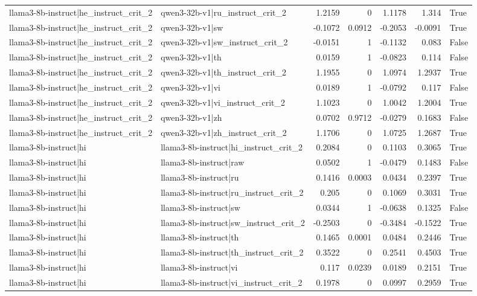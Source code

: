\begin{table}
\begin{tabular}{l l r r r r l}
llama3-8b-instruct|he_instruct_crit_2 & qwen3-32b-v1|ru_instruct_crit_2 & 1.2159 & 0 & 1.1178 & 1.314 & True \\
llama3-8b-instruct|he_instruct_crit_2 & qwen3-32b-v1|sw & -0.1072 & 0.0912 & -0.2053 & -0.0091 & True \\
llama3-8b-instruct|he_instruct_crit_2 & qwen3-32b-v1|sw_instruct_crit_2 & -0.0151 & 1 & -0.1132 & 0.083 & False \\
llama3-8b-instruct|he_instruct_crit_2 & qwen3-32b-v1|th & 0.0159 & 1 & -0.0823 & 0.114 & False \\
llama3-8b-instruct|he_instruct_crit_2 & qwen3-32b-v1|th_instruct_crit_2 & 1.1955 & 0 & 1.0974 & 1.2937 & True \\
llama3-8b-instruct|he_instruct_crit_2 & qwen3-32b-v1|vi & 0.0189 & 1 & -0.0792 & 0.117 & False \\
llama3-8b-instruct|he_instruct_crit_2 & qwen3-32b-v1|vi_instruct_crit_2 & 1.1023 & 0 & 1.0042 & 1.2004 & True \\
llama3-8b-instruct|he_instruct_crit_2 & qwen3-32b-v1|zh & 0.0702 & 0.9712 & -0.0279 & 0.1683 & False \\
llama3-8b-instruct|he_instruct_crit_2 & qwen3-32b-v1|zh_instruct_crit_2 & 1.1706 & 0 & 1.0725 & 1.2687 & True \\
llama3-8b-instruct|hi & llama3-8b-instruct|hi_instruct_crit_2 & 0.2084 & 0 & 0.1103 & 0.3065 & True \\
llama3-8b-instruct|hi & llama3-8b-instruct|raw & 0.0502 & 1 & -0.0479 & 0.1483 & False \\
llama3-8b-instruct|hi & llama3-8b-instruct|ru & 0.1416 & 0.0003 & 0.0434 & 0.2397 & True \\
llama3-8b-instruct|hi & llama3-8b-instruct|ru_instruct_crit_2 & 0.205 & 0 & 0.1069 & 0.3031 & True \\
llama3-8b-instruct|hi & llama3-8b-instruct|sw & 0.0344 & 1 & -0.0638 & 0.1325 & False \\
llama3-8b-instruct|hi & llama3-8b-instruct|sw_instruct_crit_2 & -0.2503 & 0 & -0.3484 & -0.1522 & True \\
llama3-8b-instruct|hi & llama3-8b-instruct|th & 0.1465 & 0.0001 & 0.0484 & 0.2446 & True \\
llama3-8b-instruct|hi & llama3-8b-instruct|th_instruct_crit_2 & 0.3522 & 0 & 0.2541 & 0.4503 & True \\
llama3-8b-instruct|hi & llama3-8b-instruct|vi & 0.117 & 0.0239 & 0.0189 & 0.2151 & True \\
llama3-8b-instruct|hi & llama3-8b-instruct|vi_instruct_crit_2 & 0.1978 & 0 & 0.0997 & 0.2959 & True \\

\end{tabular}
\end{table}
